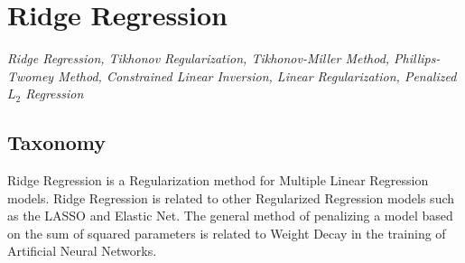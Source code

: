 
\section{Ridge Regression} 
\label{sec:ridge}

\emph{Ridge Regression, Tikhonov Regularization, Tikhonov-Miller Method, Phillips-Twomey Method, Constrained Linear Inversion, Linear Regularization, Penalized $L_2$ Regression}

\subsection{Taxonomy}
Ridge Regression is a Regularization method for Multiple Linear Regression models.
Ridge Regression is related to other Regularized Regression models such as the LASSO and Elastic Net.
The general method of penalizing a model based on the sum of squared parameters is related to Weight Decay in the training of Artificial Neural Networks.

